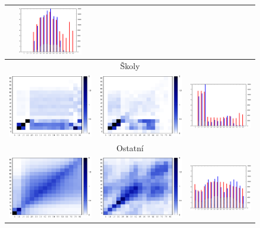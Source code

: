 \begin{figure}
\begin{center}
\begin{tabular}{|ccc|}
      \includegraphics[width=28mm]{pic/work.eps}\\
      \hline
      \multicolumn{3}{|c|}{Školy} \\      
      \includegraphics[width=38mm]{pic/school_mat.eps} &
      \includegraphics[width=38mm]{pic/school_mat_ref.eps} &
      \includegraphics[width=28mm]{pic/school.eps}\\
      \hline
      \multicolumn{3}{|c|}{Ostatní} \\      
      \includegraphics[width=38mm]{pic/other_mat.eps} &
      \includegraphics[width=38mm]{pic/other_mat_ref.eps} &
      \includegraphics[width=28mm]{pic/other.eps}\\

\end{tabular}
\end{center}
\end{figure}
